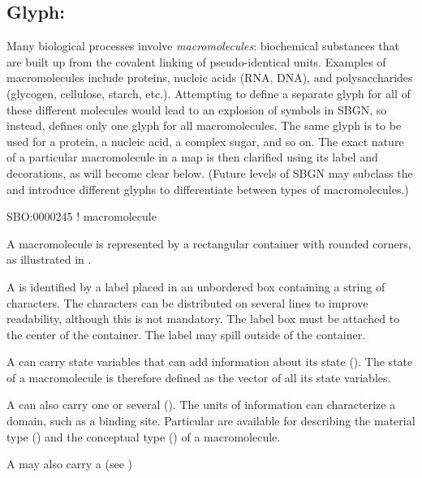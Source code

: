 
\subsection{Glyph: }
\label{sec:macromolecule}

Many biological processes involve \emph{macromolecules}: biochemical substances that are built up from the covalent linking of pseudo-identical units.  Examples of macromolecules include proteins, nucleic acids (RNA, DNA), and polysaccharides (glycogen, cellulose, starch, etc.).  Attempting to define a separate glyph for all of these different molecules would lead to an explosion of symbols in SBGN, so instead, \SBGNPDLone defines only one glyph for all macromolecules.  The same glyph is to be used for a protein, a nucleic acid, a complex sugar, and so on.  The exact nature of a particular macromolecule in a map is then clarified using its label and decorations, as will become clear below.  (Future levels of SBGN may subclass the  and introduce different glyphs to differentiate between types of macromolecules.)

\begin{glyphDescription}

\glyphSboTerm SBO:0000245 ! macromolecule 

\glyphContainer A macromolecule is represented by a rectangular container with rounded corners, as illustrated in .

\glyphLabel A  is identified by a label placed in an unbordered box containing a string of characters.  The characters can be distributed on several lines to improve readability, although this is not mandatory.  The label box must be attached to the center of the container.  The label may spill outside of the container.

\glyphAux A  can carry state variables that can add information about its state ().  The state of a macromolecule is therefore defined as the vector of all its state variables. 

A  can also carry one or several  ().  The units of information can characterize a domain, such as a binding site.  Particular  are available for describing the material type () and the conceptual type () of a macromolecule.  

A  may also carry a  (see )

\end{glyphDescription}

